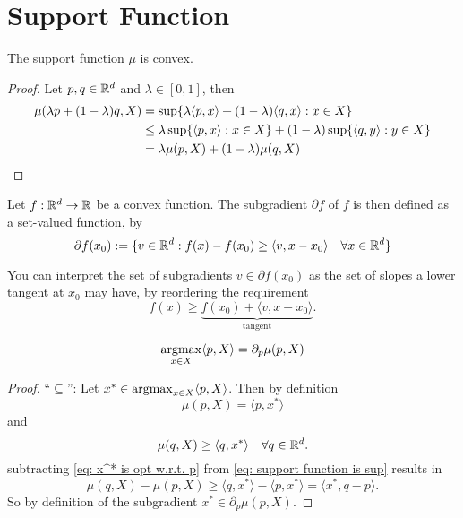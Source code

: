 \section{Support Function}

\begin{lemma}[Convexity]
	The support function \(\mu\) is convex.	
\end{lemma}
\begin{proof}
	Let \(p,q \in \mathbb{R}^d\) and \(\lambda\in[0,1]\), then
	\begin{align*}
		\mu(\lambda p + (1-\lambda)q , X)
		&= \sup\{\lambda \langle  p , x\rangle + (1-\lambda)\langle q, x\rangle : x\in X\}\\
		&\le \lambda \sup\{\langle p, x\rangle :x\in X\}
		+ (1-\lambda) \sup\{\langle q, y\rangle : y \in X\}\\
		&= \lambda \mu(p, X)+ (1-\lambda)\mu(q, X)
		\qedhere
	\end{align*}
\end{proof}

\begin{definition}[Subgradient]
	Let \(f:\mathbb{R}^d\to \mathbb{R}\) be a convex function. The subgradient
	\(\partial f\) of \(f\) is then defined as a set-valued function, by
	\[
		\partial f(x_0)
		:= \{
			v\in \mathbb{R}^d :
			f(x)-f(x_0) \ge \langle v, x-x_0\rangle
			\quad \forall x\in\mathbb{R}^d
		\}
	\]
\end{definition}

You can interpret the set of subgradients \(v\in\partial f(x_0)\) as the
set of slopes a lower tangent at \(x_0\) may have, by reordering the requirement
\[
	f(x) \ge \underbrace{f(x_0) + \langle v, x-x_0\rangle}_{\text{tangent}}.
\]

\begin{lemma}
	\label{lem: subgradient of support functions}
	\[
		\operatorname*{argmax}_{x\in X}\langle p, X\rangle = \partial_p \mu(p, X)
	\]
\end{lemma}
\begin{proof}
	``\(\subseteq\)'': Let \(x^* \in \operatorname*{argmax}_{x\in X}\langle p, X\rangle\). Then
	by definition
	\begin{equation}
		\label{eq: x^* is opt w.r.t. p}
		\mu(p, X) = \langle p, x^*\rangle
	\end{equation}
	and
	\begin{equation}
		\label{eq: support function is sup}
		\mu(q, X) \ge \langle q, x^*\rangle \quad \forall q\in\mathbb{R}^d.
	\end{equation}
	subtracting \eqref{eq: x^* is opt w.r.t. p} from \eqref{eq: support function is sup}
	results in
	\[
		\mu(q, X) - \mu(p, X)
		\ge \langle q, x^*\rangle - \langle p, x^*\rangle
		= \langle x^*, q-p\rangle.
	\]
	So by definition of the subgradient \(x^*\in \partial_p \mu(p, X)\).

\end{proof}
